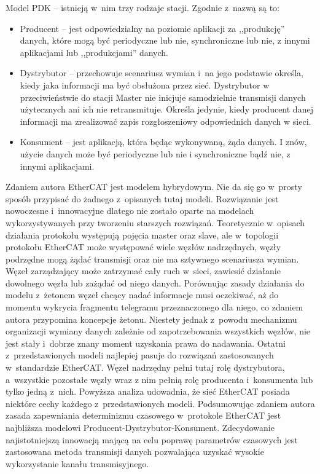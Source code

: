 Model PDK -- istnieją w~nim trzy rodzaje stacji. Zgodnie z~nazwą są to:
\begin{itemize}
\item Producent -- jest odpowiedzialny na poziomie aplikacji za ,,produkcję'' danych, które mogą być periodyczne lub nie, synchroniczne lub nie, z innymi aplikacjami lub ,,produkcjami'' danych.

\item Dystrybutor -- przechowuje scenariusz wymian i~na jego podstawie określa, kiedy jaka informacji ma być
obsłużona przez sieć. Dystrybutor w przeciwieństwie do stacji Master nie inicjuje samodzielnie transmisji
danych użytecznych ani ich nie retransmituje. Określa jedynie, kiedy producent danej informacji ma zrealizować zapis rozgłoszeniowy odpowiednich danych w sieci.

\item Konsument -- jest aplikacją, która będąc wykonywaną, żąda danych. I znów, użycie danych może być periodyczne lub nie i synchroniczne bądź nie, z innymi aplikacjami.
\end{itemize}

Zdaniem autora EtherCAT jest modelem hybrydowym. Nie da się go w~prosty sposób przypisać do żadnego z~opisanych tutaj modeli. Rozwiązanie jest nowoczesne i~innowacyjne dlatego nie zostało oparte na modelach wykorzystywanych przy tworzeniu starszych rozwiązań. Teoretycznie w~opisach działania protokołu występują pojęcia master oraz slave, ale w~topologii protokołu EtherCAT może występować wiele węzłów nadrzędnych, węzły podrzędne mogą żądać transmisji oraz nie ma sztywnego scenariusza wymian. Węzeł zarządzający może zatrzymać cały ruch w~sieci, zawiesić działanie dowolnego węzła lub zażądać od niego danych. Porównując zasady działania do modelu z~żetonem węzeł chcący nadać informacje musi oczekiwać, aż do momentu wykrycia fragmentu telegramu przeznaczonego dla niego, co zdaniem autora przypomina koncepcje żetonu. Niestety jednak z~powodu mechanizmu organizacji wymiany danych zależnie od zapotrzebowania wszystkich węzłów, nie jest stały i~dobrze znany moment uzyskania prawa do nadawania. Ostatni z~przedstawionych modeli najlepiej pasuje do rozwiązań zastosowanych w~standardzie EtherCAT. Węzeł nadrzędny pełni tutaj rolę dystrybutora, a~wszystkie pozostałe węzły wraz z nim pełnią rolę producenta i~konsumenta lub tylko jedną z~nich. Powyższa analiza udowadnia, że sieć EtherCAT posiada niektóre cechy każdego z~przedstawionych modeli. Podsumowując zdaniem autora zasada zapewniania determinizmu czasowego w~protokole EtherCAT jest najbliższa modelowi Producent-Dystrybutor-Konsument. Zdecydowanie najistotniejszą innowacją mającą na celu poprawę parametrów czasowych jest zastosowana metoda transmisji danych pozwalająca uzyskać wysokie wykorzystanie kanału transmisyjnego.

